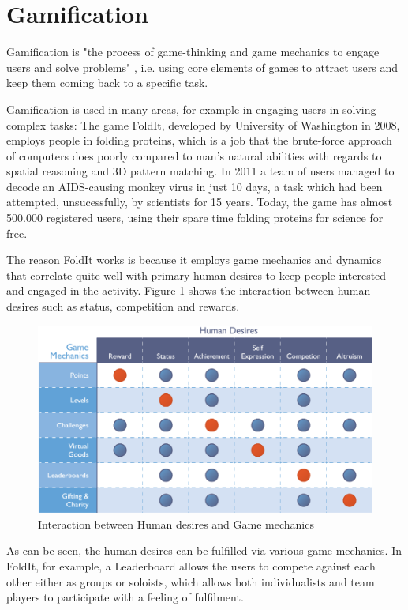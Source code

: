 \section{Gamification}\label{sec:gamification}
Gamification is "the process of game-thinking and game mechanics to engage users and solve problems" \cite{Zichermann2011}, i.e. using core elements of games to attract users and keep them coming back to a specific task.

Gamification is used in many areas, for example in engaging users in solving complex tasks: The game FoldIt, developed by University of Washington in 2008, employs people in folding proteins, which is a job that the brute-force approach of computers does poorly compared to man's natural abilities with regards to spatial reasoning and 3D pattern matching. In 2011 a team of users managed to decode an AIDS-causing monkey virus in just 10 days, a task which had been attempted, unsucessfully, by scientists for 15 years.\cite{Huff2011} Today, the game has almost 500.000 registered users, using their spare time folding proteins for science for free.\cite{FoldIt2013}

The reason FoldIt works is because it employs game mechanics and dynamics that correlate quite well with primary human desires to keep people interested and engaged in the activity.
Figure \ref{fig:bunchball} shows the interaction between human desires such as status, competition and rewards.

\begin{figure}[hptb]
  \centering
    \includegraphics[width=\textwidth]{img/bunchball.png}
  \caption{Interaction between Human desires and Game mechanics}
  \label{fig:bunchball}
\end{figure}

As can be seen, the human desires can be fulfilled via various game mechanics. In FoldIt, for example, a Leaderboard allows the users to compete against each other either as groups or soloists, which allows both individualists and team players to participate with a feeling of fulfilment. 

